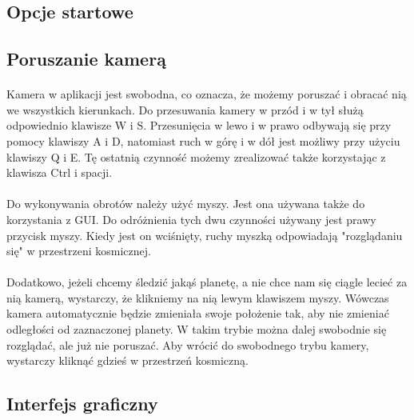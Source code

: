 \subsection{Opcje startowe}\label{sub:uruchamianie programu}
\paragraph{}

\subsection{Poruszanie kamerą}\label{sub:poruszanie kamerą}
\paragraph{}
Kamera w aplikacji jest swobodna, co oznacza, że możemy poruszać i obracać nią we wszystkich kierunkach. Do przesuwania kamery w przód i w tył służą odpowiednio klawisze W i S. Przesunięcia w lewo i w prawo odbywają się przy pomocy klawiszy A i D, natomiast ruch w górę i w dół jest możliwy przy użyciu klawiszy Q i E. Tę ostatnią czynność możemy zrealizować także korzystając z klawisza Ctrl i spacji.
\paragraph{}
Do wykonywania obrotów należy użyć myszy. Jest ona używana także do korzystania z GUI. Do odróżnienia tych dwu czynności używany jest prawy przycisk myszy. Kiedy jest on wciśnięty, ruchy myszką odpowiadają "rozglądaniu się" w przestrzeni kosmicznej. 
\paragraph{}
Dodatkowo, jeżeli chcemy śledzić jakąś planetę, a nie chce nam się ciągle lecieć za nią kamerą, wystarczy, że klikniemy na nią lewym klawiszem myszy. Wówczas kamera automatycznie będzie zmieniała swoje położenie tak, aby nie zmieniać odległości od zaznaczonej planety. W takim trybie można dalej swobodnie się rozglądać, ale już nie poruszać. Aby wrócić do swobodnego trybu kamery, wystarczy kliknąć gdzieś w przestrzeń kosmiczną.

\subsection{Interfejs graficzny}\label{sub:interfejs graficzny}
\paragraph{}

